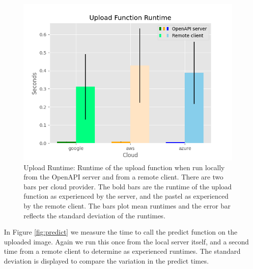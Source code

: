 \begin{figure}
\centering
\includegraphics[width=\columnwidth]{../images/sample_graph_3.png}
\caption{Upload Runtime: Runtime of the upload function when run locally from
the OpenAPI server and from a remote client. There are two bars per
cloud provider. The bold bars are the runtime of the upload function as
experienced by the server, and the pastel as experienced by the remote
client. The bars plot mean runtimes and the error bar reflects the
standard deviation of the runtimes.}
\label{fig:upload}
\end{figure}


In Figure \ref{fig:predict} we measure the time to call the predict function on the
uploaded image. Again we run this once from the local server itself, and
a second time from a remote client to determine as experienced runtimes.
The standard deviation is displayed to compare the variation in the
predict times.

